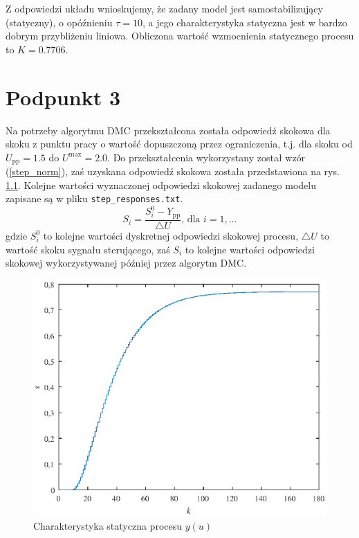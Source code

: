 Z odpowiedzi układu wnioskujemy, że zadany model jest samostabilizujący (statyczny), o opóźnieniu $\tau =10$, a jego charakterystyka statyczna jest w bardzo dobrym przybliżeniu liniowa. Obliczona wartość wzmocnienia statycznego procesu to $K=\num{0,7706}$.


\chapter{Podpunkt 3}
Na potrzeby algorytmu DMC przekształcona została odpowiedź skokowa dla skoku z punktu pracy o wartość dopuszczoną przez ograniczenia, t.j. dla skoku od $U_{\mathrm{pp}}=\num{1,5}$ do $U^{\mathrm{max}}=\num{2,0}$. Do przekształcenia wykorzystany został wzór (\ref{step_norm}), zaś uzyskana odpowiedź skokowa została przedstawiona na rys. \ref{Z3step}. Kolejne wartości wyznaczonej odpowiedzi skokowej zadanego modelu zapisane są w pliku \verb+step_responses.txt+.
\begin{equation}
S_i = \frac{S_i^0 - Y_{\mathrm{pp}}}{\triangle U} \textrm{, dla } i=1,\ldots
\label{step_norm}
\end{equation}
gdzie $S_i^0$ to kolejne wartości dyskretnej odpowiedzi skokowej procesu, $\triangle U$ to wartość skoku sygnału sterującego, zaś $S_i$ to kolejne wartości odpowiedzi skokowej wykorzystywanej później przez algorytm DMC.

\begin{figure}[ht]
\centering
\includegraphics[scale=1]{images/Z3step}
\caption{Charakterystyka statyczna procesu $y(u)$}
\label{Z3step}
\end{figure}


